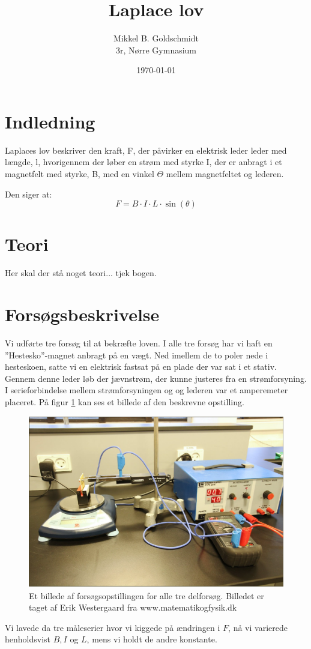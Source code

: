 \documentclass[10pt,a4paper]{article}
\author{Mikkel B. Goldschmidt\\3r, Nørre Gymnasium}
\title{Laplace lov}
\date{\today}
\theoremstyle{break}
\theoremstyle{nonumberplain}
\begin{document}
\maketitle

\section{Indledning}
Laplaces lov beskriver den kraft, F, der påvirker en elektrisk leder leder med længde, l, hvorigennem der løber en strøm med styrke I, der er anbragt i et magnetfelt med styrke, B, med en vinkel $\Theta$ mellem magnetfeltet og lederen.

Den siger at: 
$$F=B \cdot I \cdot L\cdot \sin (\theta)$$

\section{Teori}
Her skal der stå noget teori... tjek bogen.

\section{Forsøgsbeskrivelse}
Vi udførte tre forsøg til at bekræfte loven. 
I alle tre forsøg har vi haft en ''Hestesko''-magnet anbragt på en vægt. 
Ned imellem de to poler nede i hesteskoen, satte vi en elektrisk fastsat på en plade der var sat i et stativ.
Gennem denne leder løb der jævnstrøm, der kunne justeres fra en strømforsyning. 
I serieforbindelse mellem strømforsyningen og og lederen var et amperemeter placeret.
På figur \ref{opstilling} kan ses et billede af den beskrevne opstilling.	


\begin{figure}[h]
\center
\includegraphics[scale=0.4]{opstilling}
\caption{Et billede af forsøgsopstillingen for alle tre delforsøg. Billedet er taget af Erik Westergaard fra www.matematikogfysik.dk}
\label{opstilling}
\end{figure}

Vi lavede da tre måleserier hvor vi kiggede på ændringen i $F$, nå vi varierede henholdsvist $B,I$ og $L$, mens vi holdt de andre konstante. 
\end{document}
